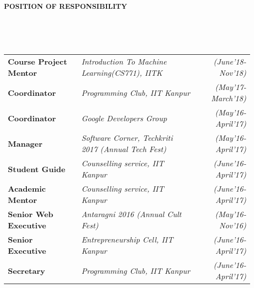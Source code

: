 \documentclass[a4paper,10pt]{article}
\newcommand{\lsep}{-0.5cm}
\newcommand{\resheading}[1]{{\small \colorbox{mygrey}{\begin{minipage}{0.975\textwidth}{\textbf{#1 \vphantom{p\^{E}}}}\end{minipage}}}}
\begin{document}
\resheading{\textbf{POSITION OF RESPONSIBILITY} }\\[\lsep]
\\ \\ \indent
\begin{tabular}{l @{\hskip 0.5in}l @{\hskip 0.3in}r }
\textbf{Course Project Mentor} & \textit{Introduction To Machine Learning(CS771), IITK} & \emph{(June'18-Nov'18)}\\
\textbf{Coordinator} & \textit{Programming Club, IIT Kanpur} & \emph{(May'17-March'18)}\\
\textbf{Coordinator} & \textit{Google Developers Group} &
\emph{(May'16-April'17)}\\
\textbf{Manager} & \textit{Software Corner, Techkriti 2017 (Annual Tech Fest)} &
\emph{(May'16-April'17)}\\
\textbf{Student Guide} & \textit{Counselling service, IIT Kanpur} & \emph{(June'16-April'17)}\\
\textbf{Academic Mentor} & \textit{Counselling service, IIT Kanpur} & \emph{(June'16-April'17)}\\
\textbf{Senior Web Executive} & \textit{Antaragni 2016 (Annual Cult Fest)} & \emph{(May'16-Nov'16)}\\
\textbf{Senior Executive} & \textit{Entrepreneurship Cell, IIT Kanpur} & \emph{(June'16-April'17)}\\
\textbf{Secretary} & \textit{Programming Club, IIT Kanpur} & \emph{(June'16-April'17)}\\
\end{tabular}
\end{document}
